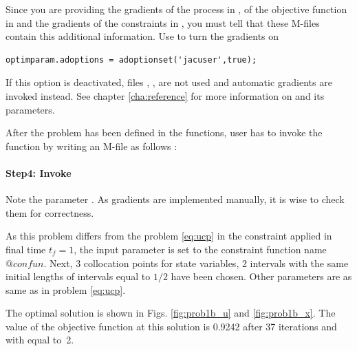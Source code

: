 Since you are providing the gradients of the process in
, of the objective function in  and
the gradients of the constraints in , you must tell
 that these M-files contain this additional
information. Use  to turn the gradients on
\begin{verbatim}
optimparam.adoptions = adoptionset('jacuser',true);
\end{verbatim}
If this option is deactivated, files ,
,  are not used and automatic
gradients are invoked instead. See chapter \ref{cha:reference} for
more information on  and its parameters.

After the problem has been defined in the functions, user has to invoke
the  function by writing an M-file  as
follows :

\paragraph{Step4: Invoke~}

{\small }

Note the parameter . As gradients are
implemented manually, it is wise to check them for correctness.

As this problem differs from the problem \eqref{eq:ucp} in the
constraint applied in final time $t_{f} = 1$, the input parameter
 is set to the constraint function name
$@confun$. Next, 3 collocation points for state variables, 2 intervals
with the same initial lengths of intervals equal to $1/2$ have been
chosen. Other parameters are as same as in problem \eqref{eq:ucp}.

The optimal solution is shown in Figs. \ref{fig:prob1b_u} and
\ref{fig:prob1b_x}. The value of the objective function at this
solution is 0.9242 after 37 iterations and with 
equal to~2.


